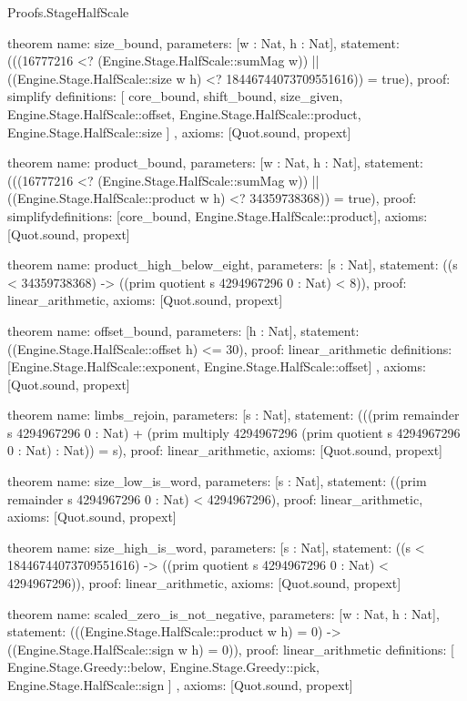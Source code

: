 \begin{lexlean}{Proofs.StageHalfScale}
\begin{semanticmodule}
theorem{
  name: size_bound,
  parameters: [w : Nat, h : Nat],
  statement: (((16777216 <? (Engine.Stage.HalfScale::sumMag w)) || ((Engine.Stage.HalfScale::size w h) <? 18446744073709551616)) = true),
  proof: simplify{
    definitions: [
      core_bound,
      shift_bound,
      size_given,
      Engine.Stage.HalfScale::offset,
      Engine.Stage.HalfScale::product,
      Engine.Stage.HalfScale::size
    ]
  },
  axioms: [Quot.sound, propext]
}

theorem{
  name: product_bound,
  parameters: [w : Nat, h : Nat],
  statement: (((16777216 <? (Engine.Stage.HalfScale::sumMag w)) || ((Engine.Stage.HalfScale::product w h) <? 34359738368)) = true),
  proof: simplify{definitions: [core_bound, Engine.Stage.HalfScale::product]},
  axioms: [Quot.sound, propext]
}

theorem{
  name: product_high_below_eight,
  parameters: [s : Nat],
  statement: ((s < 34359738368) -> ((prim quotient s 4294967296 0 : Nat) < 8)),
  proof: linear_arithmetic{},
  axioms: [Quot.sound, propext]
}

theorem{
  name: offset_bound,
  parameters: [h : Nat],
  statement: ((Engine.Stage.HalfScale::offset h) <= 30),
  proof: linear_arithmetic{
    definitions: [Engine.Stage.HalfScale::exponent, Engine.Stage.HalfScale::offset]
  },
  axioms: [Quot.sound, propext]
}

theorem{
  name: limbs_rejoin,
  parameters: [s : Nat],
  statement: (((prim remainder s 4294967296 0 : Nat) + (prim multiply 4294967296 (prim quotient s 4294967296 0 : Nat) : Nat)) = s),
  proof: linear_arithmetic{},
  axioms: [Quot.sound, propext]
}

theorem{
  name: size_low_is_word,
  parameters: [s : Nat],
  statement: ((prim remainder s 4294967296 0 : Nat) < 4294967296),
  proof: linear_arithmetic{},
  axioms: [Quot.sound, propext]
}

theorem{
  name: size_high_is_word,
  parameters: [s : Nat],
  statement: ((s < 18446744073709551616) -> ((prim quotient s 4294967296 0 : Nat) < 4294967296)),
  proof: linear_arithmetic{},
  axioms: [Quot.sound, propext]
}

theorem{
  name: scaled_zero_is_not_negative,
  parameters: [w : Nat, h : Nat],
  statement: (((Engine.Stage.HalfScale::product w h) = 0) -> ((Engine.Stage.HalfScale::sign w h) = 0)),
  proof: linear_arithmetic{
    definitions: [
      Engine.Stage.Greedy::below,
      Engine.Stage.Greedy::pick,
      Engine.Stage.HalfScale::sign
    ]
  },
  axioms: [Quot.sound, propext]
}
\end{semanticmodule}
\end{lexlean}
